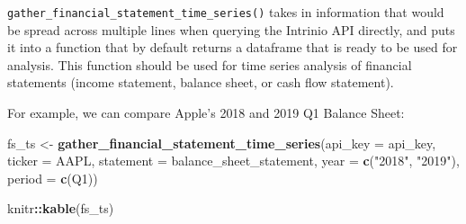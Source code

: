 \documentclass[
]{article}
\newenvironment{Shaded}{\begin{snugshade}}{\end{snugshade}}
\newcommand{\DataTypeTok}[1]{\textcolor[rgb]{0.13,0.29,0.53}{#1}}
\newcommand{\KeywordTok}[1]{\textcolor[rgb]{0.13,0.29,0.53}{\textbf{#1}}}
\newcommand{\NormalTok}[1]{#1}
\newcommand{\OperatorTok}[1]{\textcolor[rgb]{0.81,0.36,0.00}{\textbf{#1}}}
\newcommand{\StringTok}[1]{\textcolor[rgb]{0.31,0.60,0.02}{#1}}
\begin{document}
\texttt{gather\_financial\_statement\_time\_series()} takes in
information that would be spread across multiple lines when querying the
Intrinio API directly, and puts it into a function that by default
returns a dataframe that is ready to be used for analysis. This function
should be used for time series analysis of financial statements (income
statement, balance sheet, or cash flow statement).

For example, we can compare Apple's 2018 and 2019 Q1 Balance Sheet:

\begin{Shaded}
\begin{Highlighting}[]
\NormalTok{fs\_ts \textless{}{-}}\StringTok{ }\KeywordTok{gather\_financial\_statement\_time\_series}\NormalTok{(}\DataTypeTok{api\_key =}\NormalTok{ api\_key, }
                                                \DataTypeTok{ticker =} \StringTok{\textquotesingle{}AAPL\textquotesingle{}}\NormalTok{,}
                                                \DataTypeTok{statement =} \StringTok{\textquotesingle{}balance\_sheet\_statement\textquotesingle{}}\NormalTok{, }
                                                \DataTypeTok{year =} \KeywordTok{c}\NormalTok{(}\StringTok{"2018"}\NormalTok{, }\StringTok{"2019"}\NormalTok{), }
                                                \DataTypeTok{period =} \KeywordTok{c}\NormalTok{(}\StringTok{\textquotesingle{}Q1\textquotesingle{}}\NormalTok{))}

\NormalTok{knitr}\OperatorTok{::}\KeywordTok{kable}\NormalTok{(fs\_ts)}
\end{Highlighting}
\end{Shaded}
\end{document}
